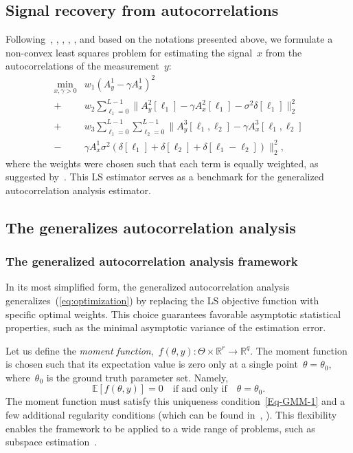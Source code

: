\documentclass{article}
\newcommand{\E}[0]{\mathbb{E}}
\newcommand{\R}[0]{\mathbb{R}}
\begin{document}
\subsection{Signal recovery from autocorrelations}
\label{subsec:sig_recovery}
Following~\cite{bendory2019multi}, \cite{lan2020multi}, \cite{marshall2020image}, \cite{bendory2021multi}, \cite{kreymer2021two}, and based on the notations presented above, we formulate a non-convex least squares problem for estimating the signal~$x$ from the autocorrelations of the measurement~$y$:
\begin{align}
\label{eq:optimization}
\min_{x, \gamma > 0} &w_1 (A_y^1 - \gamma A_x^1)^2 \nonumber\\ +& w_2 \sum_{\ell_1 = 0}^{L - 1} \|A_y^2[\ell_1] - \gamma A_x^2[\ell_1] - \sigma^2 \delta[\ell_1]\|_2^2\nonumber\\ +& w_3 \sum_{\ell_1 = 0}^{L - 1} \sum_{\ell_2 = 0}^{L - 1} \|A_y^3[\ell_1, \ell_2] - \gamma A_x^3[\ell_1, \ell_2] \nonumber\\ -& \gamma A_{x}^1 \sigma^2 (\delta[\ell_1] + \delta[\ell_2] + \delta[\ell_1 - \ell_2])\|_2^2,
\end{align}
where the weights were chosen such that each term is equally weighted, as suggested by~\cite{bendory2019multi}. This LS estimator serves as a benchmark for the generalized autocorrelation analysis estimator.

\subsection{The generalizes autocorrelation analysis}
\label{subsec:generalized_ac}
\subsubsection{The generalized autocorrelation analysis framework}
\label{gmm:framwork}
In its most simplified form, the generalized autocorrelation analysis generalizes~(\ref{eq:optimization}) by replacing the LS objective function with specific optimal weights. This choice guarantees favorable asymptotic statistical properties, such as {the} minimal asymptotic variance of the estimation error.

Let us define the \textit{moment function},~\mbox{$f(\theta, y)\colon \Theta \times \R^r \to \R^q$}. The moment function is chosen such that its expectation value is zero only at a single point~$\theta=\theta_0$, where~$\theta_0$ is the ground truth parameter set. Namely,
\begin{equation}\label{Eq-GMM-1}
	\E\left[f(\theta,y)\right] = 0 \quad \text{if and only if} \quad \theta = \theta_0.
\end{equation}
The moment function must satisfy this uniqueness condition~\eqref{Eq-GMM-1} and a few additional regularity conditions (which can be found in~\cite{Hansen1982}, \cite{Hall2005} \cite{abas2021generalized}). This flexibility enables the framework to be applied to a wide range of problems, such as subspace estimation~\cite{fan2018optimal}.
\end{document}
